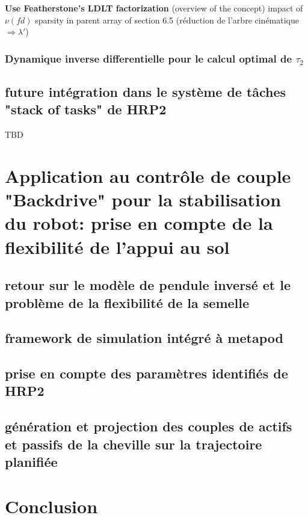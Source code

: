 \documentclass{report}
\begin{document}
\textbf{Use Featherstone's LDLT factorization}  (overview of the concept)
impact of $\nu(fd)$ sparsity in parent array of section 6.5 (réduction de l'arbre cinématique $\Rightarrow \lambda'$)

\subsection{Dynamique inverse differentielle pour le calcul optimal de $\tau_2$}



\section{future intégration dans le système de tâches "stack of tasks" de HRP2}

TBD

\chapter{Application au contrôle de couple "Backdrive" pour la stabilisation du robot: prise en compte de la flexibilité de l'appui au sol}

\section{retour sur le modèle de pendule inversé et le problème de la flexibilité de la semelle}

\section{framework de simulation intégré à metapod}

\section{prise en compte des paramètres identifiés de HRP2}

\section{génération et projection des couples de actifs et passifs de la cheville sur la trajectoire planifiée}


\chapter*{Conclusion}
%
\end{document}
